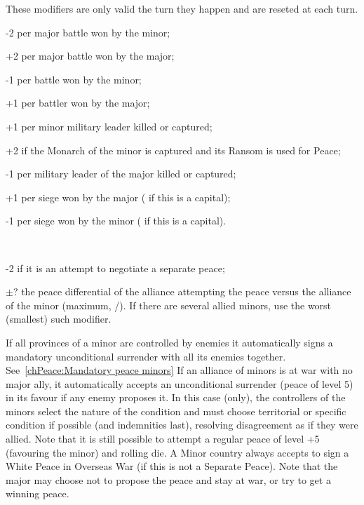  These modifiers are only valid the turn
they happen and are reseted at each turn.
\begin{modlist}
\item[-2] per major battle won by the minor;  
\item[+2] per major battle won by the major;
\item[-1] per battle won by the minor;
\item[+1] per battler won by the major;
\item[+1] per minor military leader killed or captured;
\item[+2] if the Monarch of the minor is captured and its Ransom is used for
  Peace;
\item[-1] per military leader of the major killed or captured;
\item[+1] per siege won by the major ( if this is a capital); 
\item[-1] per siege won by the minor ( if this is a capital).
\end{modlist}
~
\begin{modlist}
\item[-2] if it is an attempt to negotiate a separate peace;
\item[$\pm$?] the peace differential of the alliance attempting the peace
  versus the alliance of the minor (maximum, /). If there
  are several allied minors, use the worst (smallest) such modifier.
\end{modlist}

\label{chPeace:automatic peace minor}
\bparag If all provinces of a minor are controlled by enemies it automatically
signs a mandatory unconditional surrender with all its enemies together.
See~\ref{chPeace:Mandatory peace minors}
\bparag If an alliance of minors is at war with no major ally, it
automatically accepts an unconditional surrender (peace of level 5) in its
favour if any enemy proposes it. In this case (only), the controllers of the
minors select the nature of the condition and must choose territorial or
specific condition if possible (and indemnities last), resolving disagreement
as if they were allied. Note that it is still possible to attempt a regular
peace of level +5 (favouring the minor) and rolling die.
\bparag A Minor country always accepts to sign a White Peace in Overseas War
(if this is not a Separate Peace). Note that the major may choose not to
propose the peace and stay at war, or try to get a winning peace.

